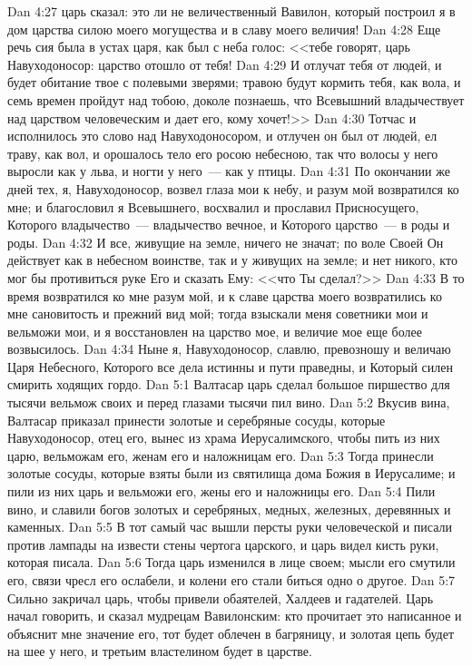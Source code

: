 \vs Dan 4:27 царь сказал: это ли не величественный Вавилон, который построил я в дом царства силою моего могущества и в славу моего величия!
\vs Dan 4:28 Еще речь сия была в устах царя, как был с неба голос: <<тебе говорят, царь Навуходоносор: царство отошло от тебя!
\vs Dan 4:29 И отлучат тебя от людей, и будет обитание твое с полевыми зверями; травою будут кормить тебя, как вола, и семь времен пройдут над тобою, доколе познаешь, что Всевышний владычествует над царством человеческим и дает его, кому хочет!>>
\vs Dan 4:30 Тотчас и исполнилось это слово над Навуходоносором, и отлучен он был от людей, ел траву, как вол, и орошалось тело его росою небесною, так что волосы у него выросли как у льва, и ногти у него~--- как у птицы.
\vs Dan 4:31 По окончании же дней тех, я, Навуходоносор, возвел глаза мои к небу, и разум мой возвратился ко мне; и благословил я Всевышнего, восхвалил и прославил Присносущего, Которого владычество~--- владычество вечное, и Которого царство~--- в роды и роды.
\vs Dan 4:32 И все, живущие на земле, ничего не значат; по воле Своей Он действует как в небесном воинстве, так и у живущих на земле; и нет никого, кто мог бы противиться руке Его и сказать Ему: <<что Ты сделал?>>
\vs Dan 4:33 В то время возвратился ко мне разум мой, и к славе царства моего возвратились ко мне сановитость и прежний вид мой; тогда взыскали меня советники мои и вельможи мои, и я восстановлен на царство мое, и величие мое еще более возвысилось.
\vs Dan 4:34 Ныне я, Навуходоносор, славлю, превозношу и величаю Царя Небесного, Которого все дела истинны и пути праведны, и Который силен смирить ходящих гордо.
\vs Dan 5:1 Валтасар царь сделал большое пиршество для тысячи вельмож своих и перед глазами тысячи пил вино.
\vs Dan 5:2 Вкусив вина, Валтасар приказал принести золотые и серебряные сосуды, которые Навуходоносор, отец его, вынес из храма Иерусалимского, чтобы пить из них царю, вельможам его, женам его и наложницам его.
\vs Dan 5:3 Тогда принесли золотые сосуды, которые взяты были из святилища дома Божия в Иерусалиме; и пили из них царь и вельможи его, жены его и наложницы его.
\vs Dan 5:4 Пили вино, и славили богов золотых и серебряных, медных, железных, деревянных и каменных.
\vs Dan 5:5 В тот самый час вышли персты руки человеческой и писали против лампады на извести стены чертога царского, и царь видел кисть руки, которая писала.
\vs Dan 5:6 Тогда царь изменился в лице своем; мысли его смутили его, связи чресл его ослабели, и колени его стали биться одно о другое.
\vs Dan 5:7 Сильно закричал царь, чтобы привели обаятелей, Халдеев и гадателей. Царь начал говорить, и сказал мудрецам Вавилонским: кто прочитает это написанное и объяснит мне значение его, тот будет облечен в багряницу, и золотая цепь будет на шее у него, и третьим властелином будет в царстве.
